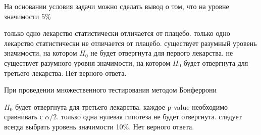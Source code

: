 \documentclass[10pt, a4paper]{exam}
\begin{document}
	\begin{questions}
		\question На основании условия задачи можно сделать вывод о том, что на уровне значимости 5\%
		\begin{choices}
			\choice только одно лекарство статистически отличается от плацебо.
			\choice только одно лекарство статистически не отличается от плацебо.
			\choice существует разумный уровень значимости, на котором $H_0$ не будет отвергнута для первого лекарства.
			\choice не существует разумного уровня значимости, на котором $H_0$ будет отвергнута для третьего лекарства.
			\choice Нет верного ответа.
		\end{choices}
	
		\question При проведении множественного тестирования методом Бонферрони
		\begin{choices}
			\choice $H_0$ будет отвергнута для третьего лекарства.
			\choice каждое p-value необходимо сравнивать с $\alpha / 2$.
			\choice только одна нулевая гипотеза не будет отвергнута.
			\choice следует всегда выбрать уровень значимости 10\%.
			\choice Нет верного ответа.
		\end{choices}
	\end{questions}
\end{document}
